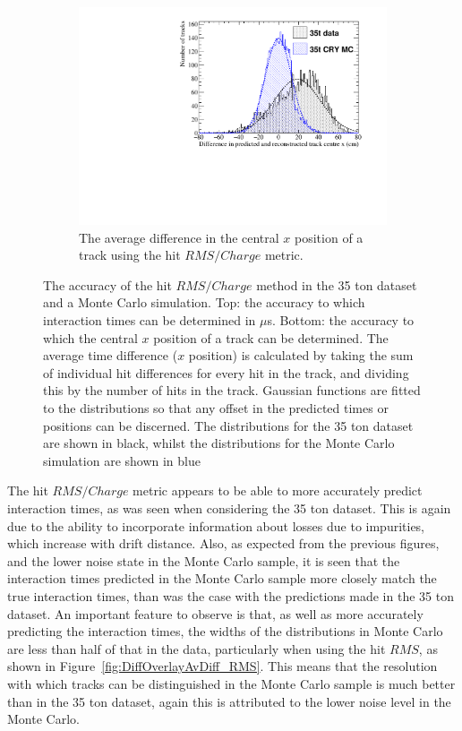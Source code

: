 \begin{figure}
  \begin{subfigure}{0.6\textwidth}
    \centering
    \includegraphics[width=\textwidth]{Overlay_AvXPosDiff_RMS_Int}
    \caption{The average difference in the central $x$ position of a track using the hit $RMS/Charge$ metric.}
    \label{fig:DiffOverlayAvDiff_RMS_Int_X}
  \end{subfigure}
  \caption[Comparing the accuracy of the hit $RMS$ method in the 35 ton dataset and a Monte Carlo simulation]
          {The accuracy of the hit $RMS/Charge$ method in the 35 ton dataset and a Monte Carlo simulation. Top: the accuracy to which interaction times can be determined in $\mu$s. Bottom: the accuracy to which the central $x$ position of a track can be determined. The average time difference ($x$ position) is calculated by taking the sum of individual hit differences for every hit in the track, and dividing this by the number of hits in the track. Gaussian functions are fitted to the distributions so that any offset in the predicted times or positions can be discerned. The distributions for the 35 ton dataset are shown in black, whilst the distributions for the Monte Carlo simulation are shown in blue}
  \label{fig:DiffOverlayAvDiff_RMS_Int}
\end{figure}

The hit $RMS/Charge$ metric appears to be able to more accurately predict interaction times, as was seen when considering the 35 ton dataset. This is again due to the ability to incorporate information about losses due to impurities, which increase with drift distance. Also, as expected from the previous figures, and the lower noise state in the Monte Carlo sample, it is seen that the interaction times predicted in the Monte Carlo sample more closely match the true interaction times, than was the case with the predictions made in the 35 ton dataset. An important feature to observe is that, as well as more accurately predicting the interaction times, the widths of the distributions in Monte Carlo are less than half of that in the data, particularly when using the hit $RMS$, as shown in Figure~\ref{fig:DiffOverlayAvDiff_RMS}. This means that the resolution with which tracks can be distinguished in the Monte Carlo sample is much better than in the 35 ton dataset, again this is attributed to the lower noise level in the Monte Carlo. \\


